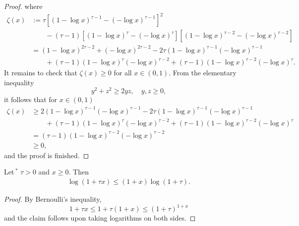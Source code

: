 \documentclass{aptpub}
\numberwithin{equation}{section}
\begin{document}
\begin{proof}
    where
    \begin{align*}
        \zeta(x)
        &:= \tau\left[(1-\log x)^{\tau-1}- (-\log x)^{\tau-1} \right]^2\\
        &\qquad\mbox{} -(\tau-1) \left[(1-\log x)^\tau- (-\log x)^\tau \right] \left[(1-\log x)^{\tau-2}- (-\log x)^{\tau-2} \right]\\ &= (1-\log x)^{2\tau-2} +(-\log x)^{2\tau-2} -2\tau(1-\log x)^{\tau-1}(-\log x)^{\tau-1}\\
        &\qquad\mbox{}+ (\tau-1)(1-\log x)^{\tau}(-\log x)^{\tau-2} +(\tau-1)(1-\log x)^{\tau-2}(-\log x)^{\tau}.
    \end{align*}
    It remains to check that $\zeta(x)\geq0$ for all $x\in(0,1)$. From the elementary inequality
    $$
        y^2+z^2
        \geq
        2yz,\quad y,z\geq 0,
    $$
    it follows that for $x\in(0,1)$
    \begin{align*}
         \zeta(x)
         &\geq 2(1-\log x)^{\tau-1}(-\log x)^{\tau-1} - 2\tau(1-\log x)^{\tau-1}(-\log x)^{\tau-1}\\
         &\qquad\mbox{} + (\tau-1)(1-\log x)^{\tau}(-\log x)^{\tau-2} + (\tau-1)(1-\log x)^{\tau-2}(-\log x)^{\tau}\\
         &=(\tau-1)(1-\log x)^{\tau-2}(-\log x)^{\tau-2}\\
         &\geq0,
    \end{align*}
    and the proof is finished.
\end{proof}

\begin{lem}\label{lohgr}
Let$\,\mbox{}^*$ $\tau> 0$ and $x\geq 0$. Then
\begin{gather*}
    \log(1+\tau x) \leq (1+x)\log(1+\tau).
\end{gather*}\end{lem}

\begin{proof}
    By Bernoulli's inequality,
    $$
        1+\tau x
        \leq 1+\tau(1+x)
        \leq (1+\tau)^{1+x}
    $$
    and the claim follows upon taking logarithms on both sides.
\end{proof}

\end{document}
